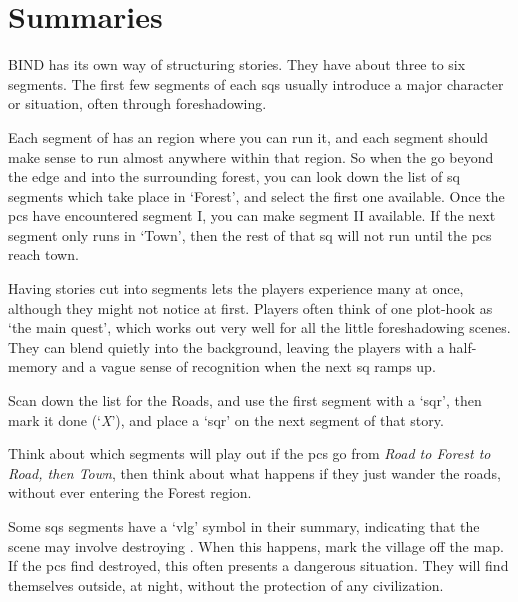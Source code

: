 \section{ Summaries}
\label{sqSummaries}

\begin{multicols}{2}

\noindent
BIND has its own way of structuring stories.
They have about three to six \glspl{segment}.
The first few \glspl{segment} of each \glspl{sq} usually introduce a major character or situation, often through foreshadowing.

Each \gls{segment} of  has an region where you can run it, and each \gls{segment} should make sense to run almost anywhere within that region.
So when the  go beyond the \gls{edge} and into the surrounding forest, you can look down the list of \gls{sq} \glspl{segment} which take place in `Forest', and select the first one available.
Once the \glspl{pc} have encountered \gls{segment} I, you can make \gls{segment} II available.
If the next \gls{segment} only runs in `Town', then the rest of that \gls{sq} will not run until the \glspl{pc} reach \gls{town}.

Having stories cut into \glspl{segment} lets the players experience many at once, although they might not notice at first.
Players often think of one plot-hook as `the main quest', which works out very well for all the little foreshadowing scenes.
They can blend quietly into the background, leaving the players with a half-memory and a vague sense of recognition when the next \gls{sq} ramps up.

Scan down the list  for the Roads, and use the first \gls{segment} with a `\gls{sqr}', then mark it done (`\textit{X}'), and place a `\gls{sqr}' on the next \gls{segment} of that story.

Think about which \glspl{segment} will play out if the \glspl{pc} go from \textit{Road to Forest to Road, then Town}, then think about what happens if they just wander the roads, without ever entering the Forest region.

Some \glspl{sq} \glspl{segment} have a `\gls{vlg}' symbol in their summary, indicating that the scene may involve destroying .
When this happens, mark the \gls{village} off the map.
If the \glspl{pc} find  destroyed, this often presents a dangerous situation.
They will find themselves outside, at night, without the protection of any civilization.


\end{multicols}
